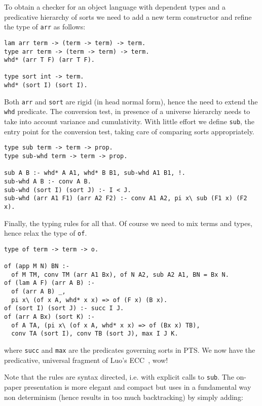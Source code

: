 \documentclass{easychair}
\begin{document}
To obtain a checker for an object language with dependent types and
a predicative hierarchy of sorts we need to add a new term constructor
and refine the type of \verb+arr+ as follows:

\begin{verbatim}
lam arr term -> (term -> term) -> term.
type arr term -> (term -> term) -> term.
whd* (arr T F) (arr T F).

type sort int -> term.
whd* (sort I) (sort I).
\end{verbatim}

Both \verb+arr+ and \verb+sort+ are rigid (in head normal form), hence the need to extend the \verb+whd+ predicate.  The conversion test, in presence of
a universe hierarchy needs to take into account variance and cumulativity.
With little effort we define \verb+sub+, the entry point for the conversion 
test, taking care of comparing sorts appropriately.

\begin{verbatim}
type sub term -> term -> prop.
type sub-whd term -> term -> prop.

sub A B :- whd* A A1, whd* B B1, sub-whd A1 B1, !.
sub-whd A B :- conv A B.
sub-whd (sort I) (sort J) :- I < J.
sub-whd (arr A1 F1) (arr A2 F2) :- conv A1 A2, pi x\ sub (F1 x) (F2 x).
\end{verbatim}

Finally, the typing rules for all that.  Of course we need to mix
terms and types, hence relax the type of \verb+of+.

\begin{verbatim}
type of term -> term -> o.

of (app M N) BN :-
  of M TM, conv TM (arr A1 Bx), of N A2, sub A2 A1, BN = Bx N.
of (lam A F) (arr A B) :-
  of (arr A B) _,
  pi x\ (of x A, whd* x x) => of (F x) (B x).
of (sort I) (sort J) :- succ I J.
of (arr A Bx) (sort K) :-
  of A TA, (pi x\ (of x A, whd* x x) => of (Bx x) TB),
  conv TA (sort I), conv TB (sort J), max I J K.
\end{verbatim}

where \verb+succ+ and \verb+max+ are the predicates governing sorts in
PTS.  We now have the predicative, universal fragment of Luo's
ECC~\cite{luo}, wow!

Note that the rules are syntax directed, i.e. with explicit calls to
\verb+sub+.  The on-paper presentation is more elegant and compact but 
uses in a fundamental way non determinism (hence results in too much
backtracking) by simply adding:
\end{document}
